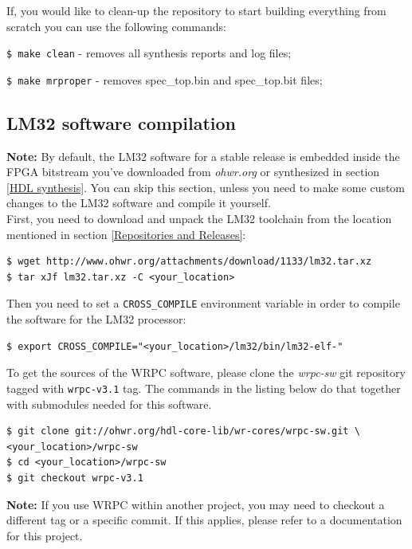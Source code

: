 \documentclass[a4paper, 12pt]{article}
\begin{document}
If, you would like to clean-up the repository to start building everything from
scratch you can use the following commands:
\begin{itemize*}
\item \texttt{\$ make clean} - removes all synthesis reports and log files;
\item \texttt{\$ make mrproper} - removes spec\_top.bin and spec\_top.bit files;
\end{itemize*}

\subsection{LM32 software compilation}
\label{LM32 software compilation}

\textbf{Note:} By default, the LM32 software for a stable release is embedded
inside the FPGA bitstream you've downloaded from \textit{ohwr.org} or
synthesized in section \ref{HDL synthesis}. You can skip this section, unless
you need to make some custom changes to the LM32 software and compile it
yourself.\\

First, you need to download and unpack the LM32 toolchain from the location
mentioned in section \ref{Repositories and Releases}:
\begin{lstlisting}
$ wget http://www.ohwr.org/attachments/download/1133/lm32.tar.xz
$ tar xJf lm32.tar.xz -C <your_location>
\end{lstlisting}

Then you need to set a \texttt{CROSS\_COMPILE} environment variable in order
to compile the software for the LM32 processor:
\begin{lstlisting}
$ export CROSS_COMPILE="<your_location>/lm32/bin/lm32-elf-"
\end{lstlisting}

To get the sources of the WRPC software, please clone the \textit{wrpc-sw} git
repository tagged with \texttt{wrpc-v3.1} tag. The commands in the listing below
do that together with submodules needed for this software.\\
\begin{lstlisting}
$ git clone git://ohwr.org/hdl-core-lib/wr-cores/wrpc-sw.git \
<your_location>/wrpc-sw
$ cd <your_location>/wrpc-sw
$ git checkout wrpc-v3.1
\end{lstlisting}

\textbf{Note:} If you use WRPC within another project, you may need to checkout
a different tag or a specific commit. If this applies, please refer to a
documentation for this project.\\
\end{document}
